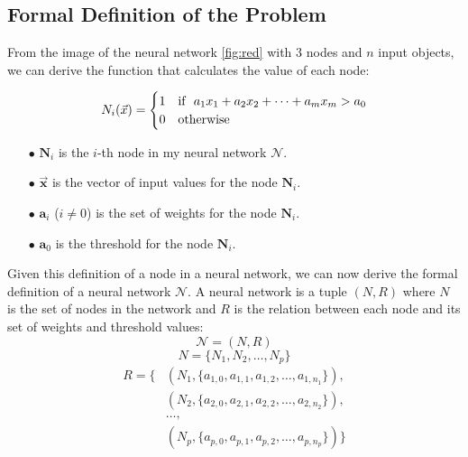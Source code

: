 \documentclass[../main]{subfiles}
\begin{document}
\subsection{Formal Definition of the Problem}

From the image of the neural network \textcolor{blue}{\ref{fig:red}} with 3 nodes and \(n\) input objects, we can derive the function that calculates the value of each node:

\begin{equation*}
    N_i(\Vec{x}) = \begin{cases}
  1 & \text{if } \ a_1x_1 + a_2x_2 + \cdots + a_mx_m > a_0 \\
  0 & \text{otherwise}
\end{cases} \vspace{3mm}
\end{equation*}

\begin{itemize}
    \item[$\bullet$] \(\textbf{N}_i\) is the \(i\)-th node in my neural network \(\mathcal{N}\).
    \item[$\bullet$] \(\Vec{\textbf{x}}\) is the vector of input values for the node \(\textbf{N}_i\).
    \item[$\bullet$] \(\textbf{a}_i\) (\(i \neq 0\)) is the set of weights for the node \(\textbf{N}_i\).
    \item[$\bullet$] \(\textbf{a}_0\) is the threshold for the node \(\textbf{N}_i\).
\end{itemize}
Given this definition of a node in a neural network, we can now derive the formal definition of a neural network \(\mathcal{N}\). A neural network is a tuple \((N, R)\) where \(N\) is the set of nodes in the network and \(R\) is the relation between each node and its set of weights and threshold values:
\begin{equation*}
    \mathcal{N} = (N, R)
\end{equation*}
\begin{equation*}
   N = \{ N_1, N_2, \ldots, N_p \}
\end{equation*}
\begin{equation*}
\begin{aligned}
   R = \{ & (N_1, \{ a_{1,0}, a_{1,1}, a_{1,2}, \ldots, a_{1,n_1} \}), \\
          & (N_2, \{ a_{2,0}, a_{2,1}, a_{2,2}, \ldots, a_{2,n_2} \}), \\
          & \dots, \\
          & (N_p, \{ a_{p,0}, a_{p,1}, a_{p,2}, \ldots, a_{p,n_p} \}) \}
\end{aligned}
\end{equation*}
\end{document}
